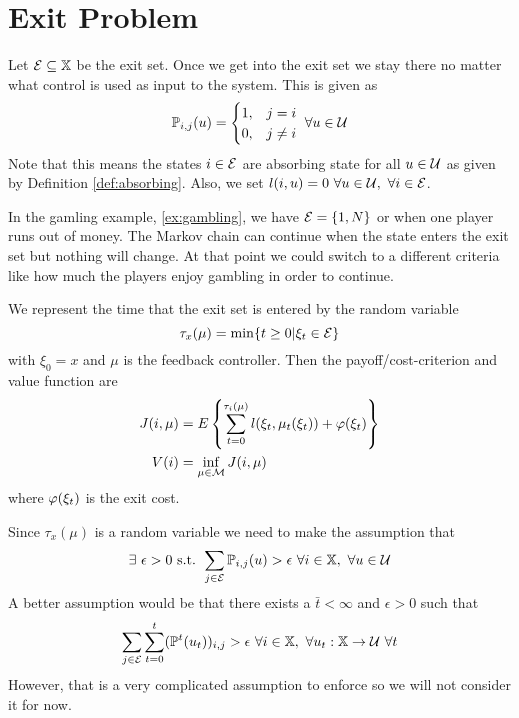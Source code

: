 
\mainmatter
\setcounter{page}{1}

\lectureseries[\course]{\course}

\date{November 5, 2009}

\setaddress

\setcounter{lecture}{11}
\setcounter{chapter}{11}


\section{Exit Problem}
Let $\mathcal{E}\subseteq\mathbb{X}$ be the exit set. Once we get into the exit set we stay there no matter what control is used as input to the system. This is given as
$$\mathbb{P}_{i,j}(u) = \begin{cases} 1, & j=i \\ 0, & j\neq i \end{cases} ~\forall u\in\mathcal{U}$$
Note that this means the states $i\in\mathcal{E}$ are absorbing state for all $u\in\mathcal{U}$ as given by Definition \ref{def:absorbing}. Also, we set $l(i,u)=0 ~\forall u\in\mathcal{U}, ~\forall i\in\mathcal{E}$.

In the gamling example, \ref{ex:gambling}, we have $\mathcal{E}=\{1,N\}$ or when one player runs out of money. The Markov chain can continue when the state enters the exit set but nothing will change. At that point we could switch to a different criteria like how much the players enjoy gambling in order to continue.

We represent the time that the exit set is entered by the random variable
$$\tau_x(\mu) = \min\{t\geq0 | \xi_t\in\mathcal{E}\}$$
with $\xi_0=x$ and $\mu$ is the feedback controller. Then the payoff/cost-criterion and value function are
\begin{align*}
J(i,\mu) &= E\left\lbrace\sum_{t=0}^{\tau_i(\mu)}l(\xi_t,\mu_t(\xi_t)) + \varphi(\xi_t)\right\rbrace \\
V(i) &= \inf_{\mu\in\mathcal{M}}J(i,\mu)
\end{align*}
where $\varphi(\xi_t)$ is the exit cost.

Since $\tau_x(\mu)$ is a random variable we need to make the assumption that
\begin{align}
\label{eq:tauassumption}
\exists~ \epsilon>0 \text{ s.t. } \sum_{j\in\mathcal{E}}\mathbb{P}_{i,j}(u)>\epsilon ~\forall i\in\mathbb{X}, ~\forall u\in\mathcal{U}
\end{align}
A better assumption would be that there exists a $\bar{t}<\infty$ and $\epsilon>0$ such that
$$\sum_{j\in\mathcal{E}}\sum_{t=0}^t(\mathbb{P}^t(u_t))_{i,j}>\epsilon ~\forall i\in\mathbb{X}, ~\forall u_t:\mathbb{X}\to\mathcal{U} ~\forall t$$
However, that is a very complicated assumption to enforce so we will not consider it for now.

